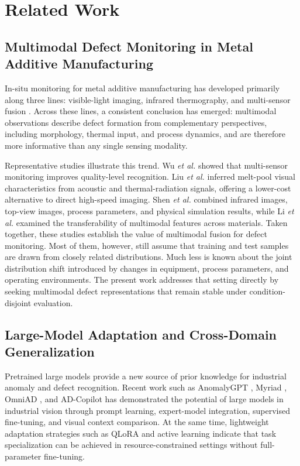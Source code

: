 \documentclass[journal]{IEEEtran}
\begin{document}
\section{Related Work}
\subsection{Multimodal Defect Monitoring in Metal Additive Manufacturing}

In-situ monitoring for metal additive manufacturing has developed primarily along three lines: visible-light imaging, infrared thermography, and multi-sensor fusion \cite{ref_defect_formation_slm,ref_in_situ_monitoring_review,ref_lpbf_sensing_review,ref_intelligent_defect_pbf}. Across these lines, a consistent conclusion has emerged: multimodal observations describe defect formation from complementary perspectives, including morphology, thermal input, and process dynamics, and are therefore more informative than any single sensing modality.

Representative studies illustrate this trend. Wu \emph{et al.} \cite{ref_wu2024_multisensor} showed that multi-sensor monitoring improves quality-level recognition. Liu \emph{et al.} \cite{ref_liu2024_acoustic} inferred melt-pool visual characteristics from acoustic and thermal-radiation signals, offering a lower-cost alternative to direct high-speed imaging. Shen \emph{et al.} \cite{ref_shen2024_multisource} combined infrared images, top-view images, process parameters, and physical simulation results, while Li \emph{et al.} \cite{ref_li2024_transfer} examined the transferability of multimodal features across materials. Taken together, these studies establish the value of multimodal fusion for defect monitoring. Most of them, however, still assume that training and test samples are drawn from closely related distributions. Much less is known about the joint distribution shift introduced by changes in equipment, process parameters, and operating environments. The present work addresses that setting directly by seeking multimodal defect representations that remain stable under condition-disjoint evaluation.

\subsection{Large-Model Adaptation and Cross-Domain Generalization}

Pretrained large models provide a new source of prior knowledge for industrial anomaly and defect recognition. Recent work such as AnomalyGPT \cite{ref_anomalygpt}, Myriad \cite{ref_myriad}, OmniAD \cite{ref_omniad}, and AD-Copilot \cite{ref_ad_copilot} has demonstrated the potential of large models in industrial vision through prompt learning, expert-model integration, supervised fine-tuning, and visual context comparison. At the same time, lightweight adaptation strategies such as QLoRA and active learning \cite{ref_qlora_excavator,ref_vlm_active_learning} indicate that task specialization can be achieved in resource-constrained settings without full-parameter fine-tuning.
\end{document}
